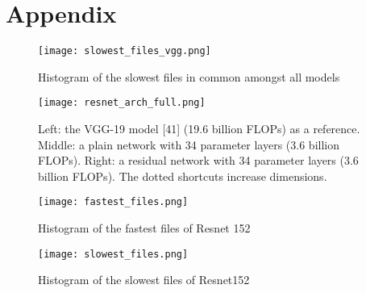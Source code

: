 
\chapter{Appendix}

\begin{figure}[ht]
       \centering 
	    \texttt{[image: slowest\_files\_vgg.png]}
        \caption{Histogram of the slowest files in common amongst all models}
         \label{fig:slowest_files_all}
\end{figure}

\begin{figure}[ht]
       \centering 
	    \texttt{[image: resnet\_arch\_full.png]}
        \caption[Example of the architecture of residual networks]{ Left: the VGG-19 model [41] (19.6 billion FLOPs) as a reference. Middle: a plain network with 34 parameter layers (3.6 billion FLOPs). Right: a residual network with 34 parameter layers (3.6 billion FLOPs). The dotted shortcuts increase dimensions.\cite{DBLP:journals/corr/HeZRS15}}
         \label{fig:resnet_arch_full}
\end{figure}
\begin{figure}[ht]
       \centering 
	    \texttt{[image: fastest\_files.png]}
        \caption{Histogram of the fastest files of Resnet 152}
         \label{fig:fastest_files_his}
\end{figure}

\begin{figure}[ht]
       \centering 
	    \texttt{[image: slowest\_files.png]}
        \caption{Histogram of the slowest files of Resnet152}
         \label{fig:slowest_files_his}
\end{figure}




